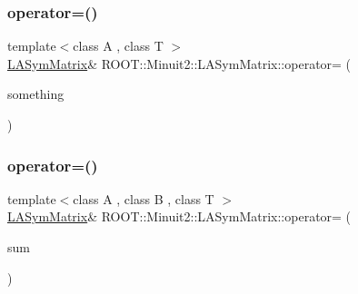 \subsubsection{\texorpdfstring{operator=()}{operator=()}\hspace{0.1cm}{\footnotesize\ttfamily [9/21]}}
{\footnotesize\ttfamily template$<$class A , class T $>$ \\
\mbox{\hyperlink{classROOT_1_1Minuit2_1_1LASymMatrix}{L\+A\+Sym\+Matrix}}\& R\+O\+O\+T\+::\+Minuit2\+::\+L\+A\+Sym\+Matrix\+::operator= (\begin{DoxyParamCaption}\item[{const \mbox{\hyperlink{classROOT_1_1Minuit2_1_1ABObj}{A\+B\+Obj}}$<$ \mbox{\hyperlink{classROOT_1_1Minuit2_1_1sym}{sym}}, \mbox{\hyperlink{classROOT_1_1Minuit2_1_1ABObj}{A\+B\+Obj}}$<$ \mbox{\hyperlink{classROOT_1_1Minuit2_1_1sym}{sym}}, A, T $>$, T $>$ \&}]{something }\end{DoxyParamCaption})\hspace{0.3cm}{\ttfamily [inline]}}

\mbox{\label{classROOT_1_1Minuit2_1_1LASymMatrix_a88d40828624a6418f8b94e239e30d322}} 
\subsubsection{\texorpdfstring{operator=()}{operator=()}\hspace{0.1cm}{\footnotesize\ttfamily [10/21]}}
{\footnotesize\ttfamily template$<$class A , class B , class T $>$ \\
\mbox{\hyperlink{classROOT_1_1Minuit2_1_1LASymMatrix}{L\+A\+Sym\+Matrix}}\& R\+O\+O\+T\+::\+Minuit2\+::\+L\+A\+Sym\+Matrix\+::operator= (\begin{DoxyParamCaption}\item[{const \mbox{\hyperlink{classROOT_1_1Minuit2_1_1ABObj}{A\+B\+Obj}}$<$ \mbox{\hyperlink{classROOT_1_1Minuit2_1_1sym}{sym}}, \mbox{\hyperlink{classROOT_1_1Minuit2_1_1ABSum}{A\+B\+Sum}}$<$ \mbox{\hyperlink{classROOT_1_1Minuit2_1_1ABObj}{A\+B\+Obj}}$<$ \mbox{\hyperlink{classROOT_1_1Minuit2_1_1sym}{sym}}, A, T $>$, \mbox{\hyperlink{classROOT_1_1Minuit2_1_1ABObj}{A\+B\+Obj}}$<$ \mbox{\hyperlink{classROOT_1_1Minuit2_1_1sym}{sym}}, B, T $>$ $>$, T $>$ \&}]{sum }\end{DoxyParamCaption})\hspace{0.3cm}{\ttfamily [inline]}}


